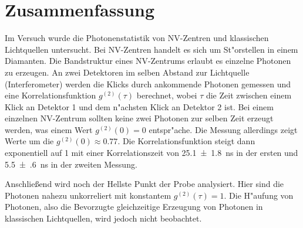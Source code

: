 \section{Zusammenfassung}
Im Versuch wurde die Photonenstatistik von NV-Zentren und klassischen Lichtquellen untersucht.
Bei NV-Zentren handelt es sich um St"orstellen in einem Diamanten.
Die Bandstruktur eines NV-Zentrums erlaubt es einzelne Photonen zu erzeugen.
An zwei Detektoren im selben Abstand zur Lichtquelle (Interferometer) werden die Klicks durch ankommende Photonen gemessen und eine Korrelationsfunktion $g^{(2)}(\tau)$ berechnet, wobei $\tau$ die Zeit zwischen einem Klick an Detektor 1 und dem n"achsten Klick an Detektor 2 ist.
Bei einem einzelnen NV-Zentrum sollten keine zwei Photonen zur selben Zeit erzeugt werden, was einem Wert $g^{(2)}(0)=0$ entspr"ache.
Die Messung allerdings zeigt Werte um die $g^{(2)}(0)\approx 0.77$.
Die Korrelationsfunktion steigt dann exponentiell auf 1 mit einer Korrelationszeit von \SI{25.1(18)}{\nano\second} in der ersten und \SI{5.5(6)}{\nano\second} in der zweiten Messung.

Anschlie\ss end wird noch der Hellste Punkt der Probe analysiert.
Hier sind die Photonen nahezu unkorreliert mit konstantem $g^{(2)}(\tau)=1$.
Die H"aufung von Photonen, also die Bevorzugte gleichzeitige Erzeugung von Photonen in klassischen Lichtquellen, wird jedoch nicht beobachtet.